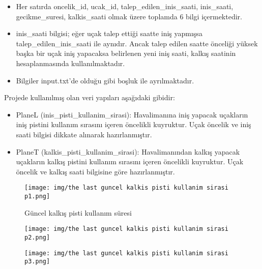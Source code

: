 \documentclass[conference]{IEEEtran}
\begin{document}
\begin{itemize}
\item Her satırda oncelik\_id, ucak\_id, talep\_edilen\_inis\_saati, inis\_saati, gecikme\_suresi, kalkis\_saati olmak üzere toplamda 6 bilgi içermektedir. 
\item inis\_saati bilgisi; eğer uçak talep ettiği saatte iniş yapmışsa talep\_edilen\_inis\_saati ile aynıdır. Ancak talep edilen saatte önceliği yüksek başka bir uçak iniş yapacaksa belirlenen yeni iniş saati, kalkış saatinin hesaplanmasında kullanılmaktadır. 
\item Bilgiler input.txt’de olduğu gibi boşluk ile ayrılmaktadır.
\end{itemize}

Projede kullanılmış olan veri yapıları aşağıdaki gibidir: 
\begin{itemize}
\item PlaneL (inis\_pisti\_kullanim\_sirasi): Havalimanına iniş yapacak uçakların iniş pistini kullanım sırasını içeren öncelikli kuyruktur. Uçak öncelik ve iniş saati bilgisi dikkate alınarak hazırlanmıştır.
\item PlaneT (kalkis\_pisti\_kullanim\_sirasi): Havalimanından kalkış yapacak uçakların kalkış pistini kullanım sırasını içeren öncelikli kuyruktur. Uçak öncelik ve kalkış saati bilgisine göre hazırlanmıştır.
\end{itemize}

\begin{figure}[h]
    \centering
    \texttt{[image: img/the last guncel kalkis pisti kullanim sirasi p1.png]}
    \caption{ Güncel kalkış pisti kullanım süresi }
\end{figure}

\begin{figure}[h]
    \centering
    \texttt{[image: img/the last guncel kalkis pisti kullanim sirasi p2.png]}
    \caption{}
\end{figure}

\begin{figure}[h]
    \centering
    \texttt{[image: img/the last guncel kalkis pisti kullanim sirasi p3.png]}
    \caption{}
\end{figure}

\newpage
\end{document}
